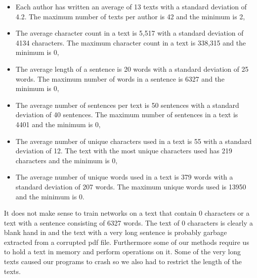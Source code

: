\begin{itemize}

    \item

        Each author has written an average of 13 texts with a standard deviation
        of 4.2. The maximum number of texts per author is 42 and the minimum is
        2,

    \item

        The average character count in a text is 5,517 with a standard deviation
        of 4134 characters. The maximum character count in a text is 338,315 and
        the minimum is 0,

    \item

        The average length of a sentence is 20 words with a standard deviation
        of 25 words. The maximum number of words in a sentence is 6327 and the
        minimum is 0,

    \item

        The average number of sentences per text is 50 sentences with a standard
        deviation of 40 sentences. The maximum number of sentences in a text is
        4401 and the minimum is 0,

    \item

        The average number of unique characters used in a text is 55 with a
        standard deviation of 12. The text with the most unique characters used
        has 219 characters and the minimum is 0,

    \item

        The average number of unique words used in a text is 379 words with a
        standard deviation of 207 words. The maximum unique words used is 13950
        and the minimum is 0.

\end{itemize}

It does not make sense to train networks on a text that contain 0 characters
or a text with a sentence consisting of 6327 words. The text of 0 characters
is clearly a blank hand in and the text with a very long sentence is probably
garbage extracted from a corrupted pdf file. Furthermore some of our methods
require us to hold a text in memory and perform operations on it. Some of the
very long texts caused our programs to crash so we also had to restrict the
length of the texts.

